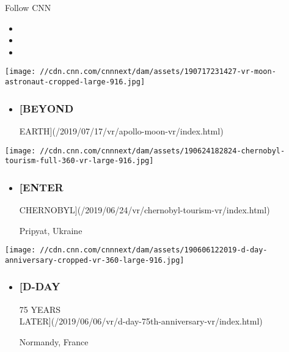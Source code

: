 Follow CNN

\begin{itemize}
\item
\item
\item
\end{itemize}

\href{/2019/07/17/vr/apollo-moon-vr/index.html}{}

\texttt{[image: //cdn.cnn.com/cnnnext/dam/assets/190717231427-vr-moon-astronaut-cropped-large-916.jpg]}

\begin{itemize}
\item
  \hypertarget{beyond}{%
  \subsubsection{{[}BEYOND}\label{beyond}}

  EARTH{]}(/2019/07/17/vr/apollo-moon-vr/index.html)
\end{itemize}

\href{/2019/06/24/vr/chernobyl-tourism-vr/index.html}{}

\texttt{[image: //cdn.cnn.com/cnnnext/dam/assets/190624182824-chernobyl-tourism-full-360-vr-large-916.jpg]}

\begin{itemize}
\item
  \hypertarget{enter}{%
  \subsubsection{{[}ENTER}\label{enter}}

  CHERNOBYL{]}(/2019/06/24/vr/chernobyl-tourism-vr/index.html)

  Pripyat, Ukraine
\end{itemize}

\href{/2019/06/06/vr/d-day-75th-anniversary-vr/index.html}{}

\texttt{[image: //cdn.cnn.com/cnnnext/dam/assets/190606122019-d-day-anniversary-cropped-vr-360-large-916.jpg]}

\begin{itemize}
\item
  \hypertarget{d-day}{%
  \subsubsection{{[}D-DAY}\label{d-day}}

  75 YEARS\\
  LATER{]}(/2019/06/06/vr/d-day-75th-anniversary-vr/index.html)

  Normandy, France
\end{itemize}

